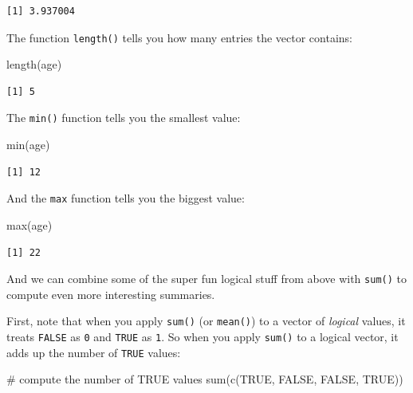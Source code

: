 \documentclass[
  letterpaper,
  DIV=11,
  numbers=noendperiod]{scrreprt}
\newenvironment{Shaded}{\begin{snugshade}}{\end{snugshade}}
\newcommand{\CommentTok}[1]{\textcolor[rgb]{0.37,0.37,0.37}{#1}}
\newcommand{\ConstantTok}[1]{\textcolor[rgb]{0.56,0.35,0.01}{#1}}
\newcommand{\FunctionTok}[1]{\textcolor[rgb]{0.28,0.35,0.67}{#1}}
\newcommand{\NormalTok}[1]{\textcolor[rgb]{0.00,0.23,0.31}{#1}}
\begin{document}
\begin{verbatim}
[1] 3.937004
\end{verbatim}

The function \texttt{length()} tells you how many entries the vector
contains:

\begin{Shaded}
\begin{Highlighting}[]
\FunctionTok{length}\NormalTok{(age)}
\end{Highlighting}
\end{Shaded}

\begin{verbatim}
[1] 5
\end{verbatim}

The \texttt{min()} function tells you the smallest value:

\begin{Shaded}
\begin{Highlighting}[]
\FunctionTok{min}\NormalTok{(age)}
\end{Highlighting}
\end{Shaded}

\begin{verbatim}
[1] 12
\end{verbatim}

And the \texttt{max} function tells you the biggest value:

\begin{Shaded}
\begin{Highlighting}[]
\FunctionTok{max}\NormalTok{(age)}
\end{Highlighting}
\end{Shaded}

\begin{verbatim}
[1] 22
\end{verbatim}

And we can combine some of the super fun logical stuff from above with
\texttt{sum()} to compute even more interesting summaries.

First, note that when you apply \texttt{sum()} (or \texttt{mean()}) to a
vector of \emph{logical} values, it treats \texttt{FALSE} as \texttt{0}
and \texttt{TRUE} as \texttt{1}. So when you apply \texttt{sum()} to a
logical vector, it adds up the number of \texttt{TRUE} values:

\begin{Shaded}
\begin{Highlighting}[]
\CommentTok{\# compute the number of TRUE values }
\FunctionTok{sum}\NormalTok{(}\FunctionTok{c}\NormalTok{(}\ConstantTok{TRUE}\NormalTok{, }\ConstantTok{FALSE}\NormalTok{, }\ConstantTok{FALSE}\NormalTok{, }\ConstantTok{TRUE}\NormalTok{))}
\end{Highlighting}
\end{Shaded}
\end{document}
